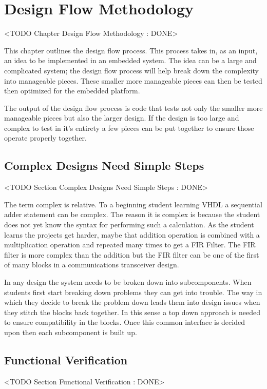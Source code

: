 \chapter{Design Flow Methodology}
	<TODO Chapter Design Flow Methodology : DONE>
	
This chapter outlines the design flow process. This process takes in, as an input, an idea to be implemented in an embedded system. The idea can be a large and complicated system; the design flow process will help break down the complexity into manageable pieces. These smaller more manageable pieces can then be tested then optimized for the embedded platform. 

The output of the design flow process is code that tests not only the smaller more manageable pieces but also the larger design. If the design is too large and complex to test in it's entirety a few pieces can be put together to ensure those operate properly together. 

\section{Complex Designs Need Simple Steps}
	<TODO Section Complex Designs Need Simple Steps : DONE>

The term complex is relative. To a beginning student learning \ac{VHDL} a sequential adder statement can be complex. The reason it is complex is because the student does not yet know the syntax for performing such a calculation. As the student learns the projects get harder, maybe that addition operation is combined with a multiplication operation and repeated many times to get a \ac{FIR} Filter.  The \ac{FIR} filter is more complex than the addition but the \ac{FIR} filter can be one of the first of many blocks in a communications transceiver design. 

In any design the system needs to be broken down into subcomponents. When students first start breaking down problems they can get into trouble. The way in which they decide to break the problem down leads them into design issues when they stitch the blocks back together. In this sense a top down approach is needed to ensure compatibility in the blocks. Once this common interface is decided upon then each subcomponent is built up.
	
\section{Functional Verification}
	<TODO Section Functional Verification : DONE>

